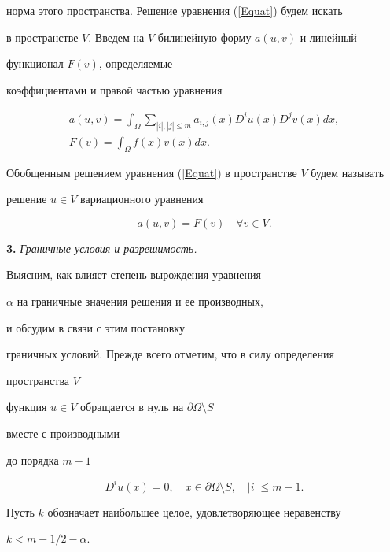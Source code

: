 норма этого пространства. Решение уравнения (\ref{Equat}) будем искать


в пространстве $V$. Введем на $V$ билинейную форму $a(u,v)$ и линейный


функционал $F(v)$, определяемые 


коэффициентами и правой частью уравнения


\begin{gather*}


a(u,v)= \int_{\Omega} {\sum_{|i|,|j|\leq m}{a_{i,j}(x)D^iu(x)D^j v(x)}dx},\\


F(v)=\int_{\Omega} {f(x) v(x)} dx.


\end{gather*}


Обобщенным решением уравнения (\ref{Equat}) в пространстве $V$ будем называть


решение $u \in V$ вариационного уравнения


\begin{equation}


a(u,v)=F(v) \quad \forall v \in V. \label{Eqvar}


\end{equation}





{\bf 3.} {\it Граничные условия и разрешимость.}


Выясним, как влияет степень вырождения уравнения


$\alpha$ на граничные значения решения и ее производных,


и обсудим в связи с этим постановку


граничных условий. Прежде всего отметим, что в силу определения


пространства $V$


функция $u \in V$ обращается в нуль на $\partial \Omega \setminus S$


вместе с производными


до порядка $m-1$ 


$$


D^i u(x) = 0, \quad x \in \partial \Omega \setminus S, \quad |i| \leq m-1.


$$





Пусть $k$ обозначает наибольшее целое, удовлетворяющее неравенству


$k < m-1/2 - \alpha$.


